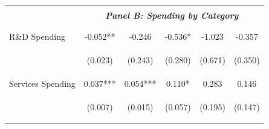 \documentclass[dv_diss_main.tex]{subfiles}
\begin{document}
\begin{table}[H]
\begin{center}
\begin{tabular}{lccccc}
    \cmidrule{2-6}
    \vspace{-1.5pt} & \vspace{-1.5pt} & \vspace{-1.5pt} & \vspace{-1.5pt} & \vspace{-1.5pt} \\
    & \multicolumn{5}{c}{\textit{\textbf{Panel B: Spending by Category}}} \\ 
    \vspace{-1.5pt} & \vspace{-1.5pt} & \vspace{-1.5pt} & \vspace{-1.5pt} & \vspace{-1.5pt} \\ 
    \cmidrule{2-6}
    \vspace{-1.5pt} & \vspace{-1.5pt} & \vspace{-1.5pt} & \vspace{-1.5pt} & \vspace{-1.5pt} \\
    R\&D Spending & -0.052** & -0.246 & -0.536* & -1.023 & -0.357 \\
    \vspace{4pt} & \begin{footnotesize}(0.023)\end{footnotesize} & \begin{footnotesize}(0.243)\end{footnotesize} & \begin{footnotesize}(0.280)\end{footnotesize} & \begin{footnotesize}(0.671)\end{footnotesize} & \begin{footnotesize}(0.350)\end{footnotesize} \\
    Services Spending & 0.037*** & 0.054*** & 0.110* & 0.283 & 0.146 \\
    \vspace{4pt} & \begin{footnotesize}(0.007)\end{footnotesize} & \begin{footnotesize}(0.015)\end{footnotesize} & \begin{footnotesize}(0.057)\end{footnotesize} & \begin{footnotesize}(0.195)\end{footnotesize} & \begin{footnotesize}(0.147)\end{footnotesize} \\

\end{tabular}
\end{center}
\end{table}
\end{document}
